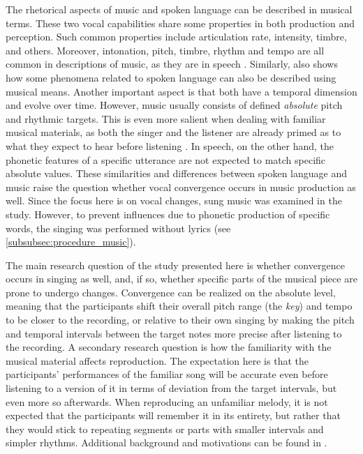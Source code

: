 The rhetorical aspects of music and spoken language can be described in musical terms.
These two vocal capabilities share some properties in both production and perception.
Such common properties include articulation rate, intensity, timbre, and others.
Moreover, intonation, pitch, timbre, rhythm and tempo are all common in descriptions of music, as they are in speech \citep{Molino2000toward, Jackendoff2009parallels}.
Similarly, \citet{Day2013speech} also shows how some phenomena related to spoken language can also be described using musical means.
Another important aspect is that both have a temporal dimension and evolve over time.
However, music usually consists of defined \emph{absolute} pitch and rhythmic targets.
This is even more salient when dealing with familiar musical materials, as both the singer and the listener are already primed as to what they expect to hear before listening \citep{Meyer2008emotion}.
In speech, on the other hand, the phonetic features of a specific utterance are not expected to match specific absolute values.
These similarities and differences between spoken language and music raise the question whether vocal convergence occurs in music production as well.
Since the focus here is on vocal changes, sung music was examined in the study.
However, to prevent influences due to phonetic production of specific words, the singing was performed without lyrics (see \cref{subsubsec:procedure_music}).

The main research question of the study presented here is whether convergence occurs in singing as well, and, if so, whether specific parts of the musical piece are prone to undergo changes.
Convergence can be realized on the absolute level, meaning that the participants shift their overall pitch range (the \emph{key}) and tempo to be closer to the recording, or relative to their own singing by making the pitch and temporal intervals between the target notes more precise after listening to the recording.
A secondary research question is how the familiarity with the musical material affects reproduction.
The expectation here is that the participants' performances of the familiar song will be accurate even before listening to a version of it in terms of deviation from the target intervals, but even more so afterwards.
When reproducing an unfamiliar melody, it is not expected that the participants will remember it in its entirety, but rather that they would stick to repeating segments or parts with smaller intervals and simpler rhythms.
Additional background and motivations can be found in \citet{Raveh2020SpeechProsody}.

